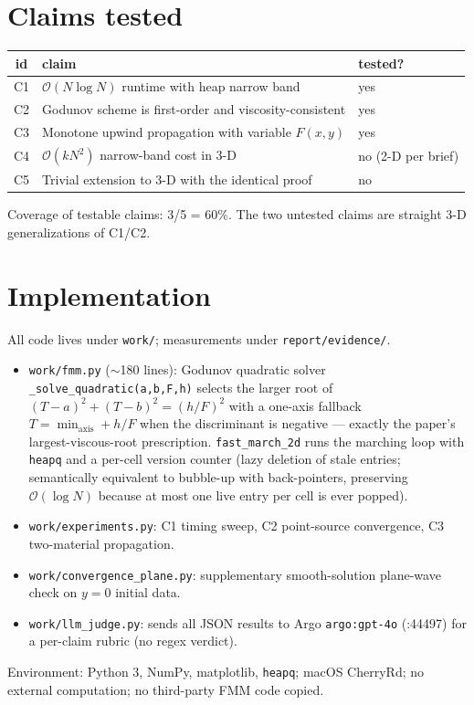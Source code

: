 \documentclass[11pt]{article}
\begin{document}
\section{Claims tested}
\begin{center}
\begin{tabular}{cll}
\toprule
id & claim & tested?\\ \midrule
C1 & $\mathcal{O}(N\log N)$ runtime with heap narrow band & yes \\
C2 & Godunov scheme is first-order and viscosity-consistent & yes \\
C3 & Monotone upwind propagation with variable $F(x,y)$ & yes \\
C4 & $\mathcal{O}(kN^2)$ narrow-band cost in 3-D & no (2-D per brief) \\
C5 & Trivial extension to 3-D with the identical proof & no \\
\bottomrule
\end{tabular}
\end{center}
Coverage of testable claims: 3/5 = 60\%. The two untested claims are
straight 3-D generalizations of C1/C2.

\section{Implementation}
All code lives under \texttt{work/}; measurements under \texttt{report/evidence/}.
\begin{itemize}
\item \texttt{work/fmm.py} ($\sim$180 lines): Godunov quadratic solver
\lstinline{_solve_quadratic(a,b,F,h)} selects the larger root of
$(T-a)^2+(T-b)^2=(h/F)^2$ with a one-axis fallback
$T=\min_{\text{axis}}+h/F$ when the discriminant is negative --- exactly the
paper's largest-viscous-root prescription. \lstinline{fast_march_2d} runs
the marching loop with \texttt{heapq} and a per-cell version counter (lazy
deletion of stale entries; semantically equivalent to bubble-up with
back-pointers, preserving $\mathcal{O}(\log N)$ because at most one live
entry per cell is ever popped).
\item \texttt{work/experiments.py}: C1 timing sweep, C2 point-source
convergence, C3 two-material propagation.
\item \texttt{work/convergence\_plane.py}: supplementary smooth-solution
plane-wave check on $y=0$ initial data.
\item \texttt{work/llm\_judge.py}: sends all JSON results to Argo
\texttt{argo:gpt-4o} (:44497) for a per-claim rubric (no regex verdict).
\end{itemize}
Environment: Python 3, NumPy, matplotlib, \texttt{heapq}; macOS CherryRd; no
external computation; no third-party FMM code copied.
\end{document}

